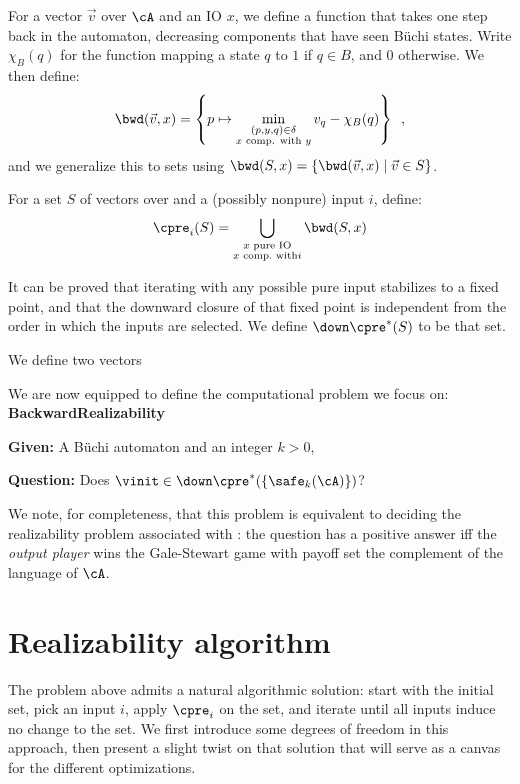 \documentclass[sigconf,screen]{acmart}
\begin{document}
For a vector \(\vec{v}\) over \(\cA\) and an IO \(x\), we define a function that takes
one step back in the automaton, decreasing components that have seen Büchi
states.  Write \(\chi_B(q)\) for the function mapping a state \(q\) to \(1\) if \(q \in B\),
and \(0\) otherwise.  We then define:
\[\bwd(\vec{v}, x) = \left\{p \mapsto \min_{\substack{(p, y, q) \in \delta\\ x \text{ comp. with } y}} v_q -
  \chi_B(q)\right\}\enspace,\]
and we generalize this to sets using \(\bwd(S, x) = \{\bwd(\vec{v}, x) \mid \vec{v}
\in S\}\).

For a set \(S\) of vectors over \cA and a (possibly nonpure) input \(i\), define:
\[\cpre_i(S) = \bigcup_{\substack{x \text{ pure IO}\\x \text{ comp.\ with} i}} \bwd(S, x)\]

It can be proved that iterating \cpre with any possible pure input stabilizes to
a fixed point, and that the downward closure of that fixed point is independent
from the order in which the inputs are selected.  We define
\(\down\cpre^*(S)\) to be that set.

We define two vectors 

We are now equipped to define the computational problem we focus on:\\[1em]
\textbf{BackwardRealizability}
\begin{compactitem}
\item \textbf{Given:} A Büchi automaton \cA and an integer \(k > 0\),
\item \textbf{Question:} Does \(\vinit \in \down\cpre^*(\{\safe_k(\cA)\})\)?
\end{compactitem}
\vspace{1em}

We note, for completeness, that this problem is equivalent to deciding the
realizability problem associated with \cA: the question has a positive answer
iff the \emph{output player} wins the Gale-Stewart game with payoff set the
complement of the language of \(\cA\).

\section{Realizability algorithm}

The problem above admits a natural algorithmic solution: start with the initial
set, pick an input \(i\), apply \(\cpre_i\) on the set, and iterate until all inputs
induce no change to the set.  We first introduce some degrees of freedom in this
approach, then present a slight twist on that solution that will serve as a
canvas for the different optimizations.
\end{document}
